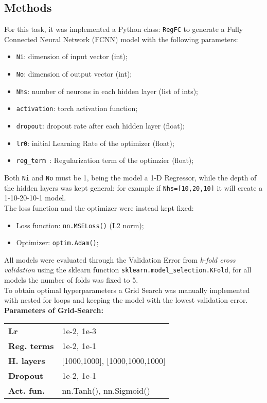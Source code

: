 \documentclass[11pt,a4paper,twocolumn]{IEEEtran}
\newcommand{\thinsepline}{\noindent\makebox[\linewidth]{\rule{7.5cm}{0.02pt}}}
\begin{document}
			\subsection{\textbf{Methods}}
			For this task, it was implemented a Python class: \texttt{RegFC} to generate a Fully Connected Neural Network (FCNN) model with the following parameters:
			\begin{itemize}
				\item \texttt{Ni}: dimension of input vector (int);
				\item \texttt{No}: dimension of output vector (int);
				\item \texttt{Nhs}: number of neurons in each hidden layer (list of ints);
				\item \texttt{activation}: torch activation function;
				\item \texttt{dropout}: dropout rate after each hidden layer (float);
				\item \texttt{lr0}: initial Learning Rate of the optimizer (float);
				\item \texttt{reg\_term }: Regularization term of the optimzier (float);
			\end{itemize}
			Both \texttt{Ni} and \texttt{No} must be 1, being the model a 1-D Regressor, while the depth of the hidden layers was kept general: for example if \texttt{Nhs=[10,20,10]} it will create a 1-10-20-10-1 model.\medskip\\
			The loss function and the optimizer were instead kept fixed:
			\begin{itemize}
				\item Loss function: \texttt{nn.MSELoss()} (L2 norm);
				\item Optimizer: \texttt{optim.Adam()};
			\end{itemize}
			All models were evaluated through the Validation Error from \textit{k-fold cross validation} using the sklearn function \texttt{sklearn.model\_selection.KFold}, for all models the number of folds was fixed to 5.\\
			To obtain optimal hyperparameters a Grid Search was manually implemented with nested for loops and keeping the model with the lowest validation error.
			\thinsepline\\
			\textbf{Parameters of Grid-Search:}\medskip\\
			\begin{tabular}{ll}
			\textbf{Lr}	& 1e-2, 1e-3 \\
			\textbf{Reg. terms}	& 1e-2, 1e-1 \\
			\textbf{H. layers} & [1000,1000], [1000,1000,1000] \\
			\textbf{Dropout} & 1e-2, 1e-1 \\
			\textbf{Act. fun.} & nn.Tanh(), nn.Sigmoid()
			\end{tabular}
			\thinsepline
\end{document}
